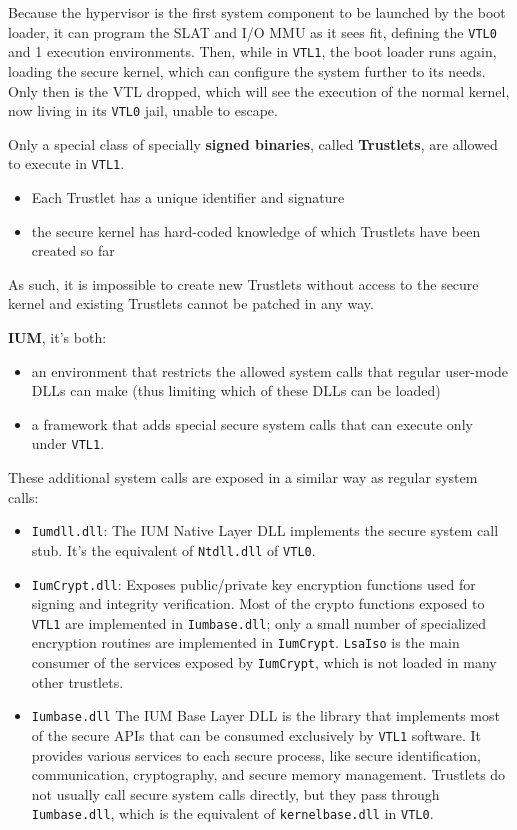 Because the hypervisor is the first system component to be launched by the boot loader, it can program the SLAT and I/O MMU as it sees fit, defining the \verb+VTL0+ and 1 execution environments. Then, while in \verb+VTL1+, the boot loader runs again, loading the secure kernel, which can configure the system further to its needs. Only then is the VTL dropped, which will see the execution of the normal kernel, now living in its \verb+VTL0+ jail, unable to escape.


Only a special class of specially {\bf signed binaries}, called {\bf Trustlets}, are allowed to execute in \verb+VTL1+. 
\begin{itemize}
    \item Each Trustlet has a unique identifier and signature
    \item the secure kernel has hard-coded knowledge of which Trustlets have been created so far
\end{itemize}

As such, it is impossible to create new Trustlets without access to the secure kernel and existing Trustlets cannot be patched in any way.

{\bf IUM}, it’s both:
\begin{itemize}
    \item an environment that restricts the allowed system calls that regular user-mode DLLs can make (thus limiting which of these DLLs can be loaded) 
    \item a framework that adds special secure system calls that can execute only under \verb+VTL1+. 
\end{itemize}    

These additional system calls are exposed in a similar way as regular system calls:
\begin{itemize}
    \item \verb+Iumdll.dll+: The IUM Native Layer DLL implements the secure system call stub. It’s the equivalent of \verb+Ntdll.dll+ of \verb+VTL0+.
    \item \verb+IumCrypt.dll+: Exposes public/private key encryption functions used for signing and integrity verification. Most of the crypto functions exposed to \verb+VTL1+ are implemented in \verb+Iumbase.dll+; only a small number of specialized encryption routines are implemented in \verb+IumCrypt+. \verb+LsaIso+ is the main consumer of the services exposed by \verb+IumCrypt+, which is not loaded in many other trustlets.
    \item \verb+Iumbase.dll+ The IUM Base Layer DLL is the library that implements most of the secure APIs that can be consumed exclusively by \verb+VTL1+ software. It provides various services to each secure process, like secure identification, communication, cryptography, and secure memory management. Trustlets do not usually call secure system calls directly, but they pass through \verb+Iumbase.dll+, which is the equivalent of \verb+kernelbase.dll+ in \verb+VTL0+.
\end{itemize}


